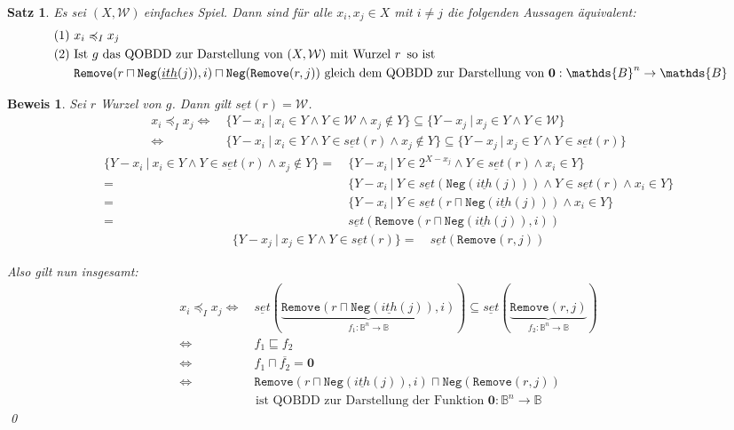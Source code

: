 \documentclass[ngerman]{scrartcl}
\theoremstyle{custom}
\newtheorem{ms}[mdef]{Satz}
\newtheorem*{bw}{Beweis}
\newcommand{\0}{\mathbf{0}}
\newcommand{\1}{\mathbf{L}}
\newcommand{\bol}{\mathds{B}^n \rightarrow \mathds{B}}
\newcommand{\set}{\underline{set}}
\newcommand{\sg}{$(X,\mathcal{W})~$}
\newcommand{\W}{\mathcal{W}}
\newcommand{\ith}{\underline{ith}}
\newcommand{\ww}{\preccurlyeq _{I}}
\begin{document}
\begin{ms}
Es sei \sg einfaches Spiel. Dann sind f\"ur alle $x_i, x_j \in X$ mit
$i \not = j$ die folgenden Aussagen \"aquivalent:
\begin{align*}
\text{ (1) }& x_i \ww x_j\\
\text{ (2) }& \text{Ist } g \text{ das QOBDD zur Darstellung von } (X,\W) \text{
  mit Wurzel } r \text{\, so ist }\\
& \texttt{Remove}(r \sqcap
\texttt{Neg}(\ith(j)),i) \sqcap \texttt{Neg}(\texttt{Remove}(r,j)) \text{
  gleich dem QOBDD zur Darstellung von } \0: \bol
\end{align*}
\end{ms}

\begin{bw}
Sei $r$ Wurzel von $g$. Dann gilt $\set(r) = \W$.
\begin{align*}
x_i \ww x_j \Leftrightarrow&~ \{Y-x_i ~\vert~ x_i \in Y \wedge Y \in \W \wedge x_j \not
\in Y\} \subseteq \{Y-x_j ~\vert~ x_j \in Y \wedge Y \in \W\}\\
\Leftrightarrow&~ \{Y-x_i ~\vert~ x_i \in Y \wedge Y \in \set(r) \wedge
x_j \not \in Y\} \subseteq \{Y-x_j ~\vert~ x_j \in Y \wedge Y \in
\set(r)\}
\end{align*}
\begin{align*}
\{Y-x_i ~\vert~ x_i \in Y \wedge Y \in \set(r) \wedge
x_j \not \in Y\} =&~ \{Y-x_i ~\vert~ Y \in 2^{X-x_j} \wedge Y \in
\set(r) \wedge x_i \in Y\}\\
=&~ \{Y-x_i ~\vert~ Y \in \set(\texttt{Neg}(\ith(j))) \wedge Y \in
\set(r) \wedge x_i \in Y\} \\
=&~ \{Y-x_i ~\vert~ Y \in \set(r \sqcap \texttt{Neg}(\ith(j))) \wedge
x_i \in Y\} \\
=&~ \set(\texttt{Remove}(r \sqcap \texttt{Neg}(\ith(j)),i))
\end{align*}
\begin{align*}
\{Y-x_j ~\vert~ x_j \in Y \wedge Y \in \set(r)\} =&~ \set(\texttt{Remove}(r,j))
\end{align*}

Also gilt nun insgesamt:
\begin{align*}
x_i \ww x_j \Leftrightarrow&~ \set(\underbrace{\texttt{Remove}(r \sqcap
\texttt{Neg}(\ith(j)), i)}_{f_1: \bol}) \subseteq
\set(\underbrace{\texttt{Remove}(r,j)}_{f_2: \bol})\\
\Leftrightarrow&~ f_1 \sqsubseteq f_2\\
\Leftrightarrow&~ f_1 \sqcap \overline{f_2} = \0\\
\Leftrightarrow&~ \texttt{Remove}(r \sqcap
\texttt{Neg}(\ith(j)), i) \sqcap
\texttt{Neg}(\texttt{Remove}(r,j)) \\
&\text{ ist QOBDD zur
  Darstellung der Funktion } \0: \bol
\end{align*}
\qed
\end{bw}
\end{document}
